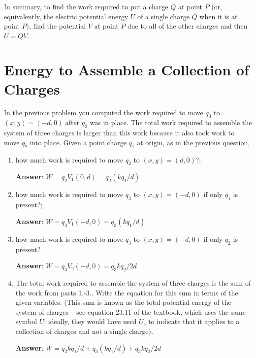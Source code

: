 \documentclass{article}
\begin{document}
In summary, to find the work required to put a charge $Q$ at point $P$ (or, equivalently, the electric potential energy $U$ of a single charge $Q$ when it is at point $P$), find the potential $V$ at point $P$ due to all of the other charges and then $U = QV$.

\newpage

\section{Energy to Assemble a Collection of Charges}

In the previous problem you computed the work required to move $q_3$ to $(x,y) = (-d,0)$ after $q_2$ was in place. The total work required to assemble the system of three charges is larger than this work because it also took work to move $q_2$ into place. Given a point charge $q_1$ at origin, as in the previous question,

\begin{enumerate}

  \item how much work is required to move $q_2$ to $(x,y) = (d,0)$?;

        \ifsolutions
        \textbf{Answer}:
        $W = q_2V_1(0,d) = q_2(kq_1/d)$
        \else

        \vskip 36pt
        \fi

  \item how much work is required to move $q_3$ to $(x,y) = (-d,0)$ if only $q_1$ is present?;

        \ifsolutions
        \textbf{Answer}:
        $W = q_3V_1(-d,0) = q_3(kq_1/d)$
        \else

        \vskip 36pt
        \fi

  \item how much work is required to move $q_3$ to $(x,y) = (-d,0)$ if only $q_2$ is present?

        \ifsolutions
        \textbf{Answer}:
        $W=q_3V_2(-d,0)=q_3kq_2/2d$
        \else

        \vskip 36pt
        \fi

  \item The total work required to assemble the system of three charges is the sum of the work from parts 1.-3.. Write the equation for this sum in terms of the given variables. (This sum is known as the total potential energy of the system of charges -- see equation 23.11 of the textbook, which uses the same symbol $U$; ideally, they would have used $U_c$ to indicate that it applies to a collection of charges and not a single charge).

        \ifsolutions
        \textbf{Answer}:
        $W=q_2kq_1/d +  q_3(kq_1/d) + q_3kq_2/2d$
        \fi

\end{enumerate}
\end{document}
